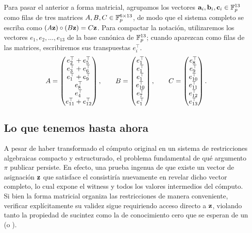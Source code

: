 Para pasar el \ROneCS anterior a forma matricial, agrupamos los vectores $\mathbf{a}_i, \mathbf{b}_i, \mathbf{c}_i \in \mathbb{F}_p^{13}$ como filas de tres matrices $A, B, C \in \mathbb{F}_p^{6 \times 13}$, de modo que el sistema completo se escriba como $(A\mathbf{z}) \circ (B\mathbf{z}) = C\mathbf{z}$. Para compactar la notación, utilizaremos los vectores $e_1, e_2, \ldots, e_{13}$ de la base canónica de $\mathbb{F}_p^{13}$; cuando aparezcan como filas de las matrices, escribiremos sus transpuestas $e_i^\top$.
$$\begin{aligned}
		A = \begin{pmatrix}
			e_2^\top + e_5^\top \\
			e_3^\top + e_6^\top \\
			e_1^\top + e_9^\top \\
			e_8^\top \\
			e_4^\top \\
			e_{11}^\top + e_{12}^\top
		\end{pmatrix},
		\qquad
		B =
		\begin{pmatrix}
			e_1^\top \\
			e_1^\top \\
			e_1^\top \\
			e_{10}^\top \\
			e_7^\top \\
			e_1^\top
		\end{pmatrix},
		\qquad
		C =
		\begin{pmatrix}
			e_8^\top \\
			e_9^\top \\
			e_{10}^\top \\
			e_{11}^\top \\
			e_{12}^\top \\
			e_{13}^\top
		\end{pmatrix}.
\end{aligned}$$

\subsection{Lo que tenemos hasta ahora}
\label{subsec:apendice-b-r1cs-lo-que-tenemos-hasta-ahora}

A pesar de haber transformado el cómputo original en un sistema de restricciones algebraicas compacto y estructurado, el problema fundamental de qué argumento $\pi$ publicar persiste. En efecto, una prueba ingenua de que existe un vector de asignación $\mathbf{z}$ que satisface el \ROneCS consistiría nuevamente en revelar dicho vector completo, lo cual expone el witness y todos los valores intermedios del cómputo. Si bien la forma matricial organiza las restricciones de manera conveniente, verificar explícitamente su validez sigue requiriendo acceso directo a $\mathbf{z}$, violando tanto la propiedad de sucintez como la de conocimiento cero que se esperan de un \SNARK (o \zkSNARK).

